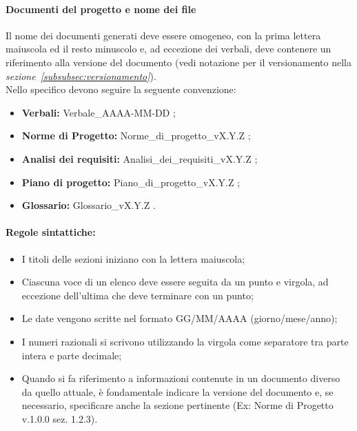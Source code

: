 \paragraph*{Documenti del progetto e nome dei file}\label{sec:NomeFile}
Il nome dei documenti generati deve essere omogeneo, con la prima lettera maiuscola ed il resto minuscolo e, ad eccezione dei verbali, deve contenere un riferimento alla versione del documento (vedi notazione per il versionamento nella \textit{sezione~\ref{subsubsec:versionamento}}). \\
Nello specifico devono seguire la seguente convenzione:
\begin{itemize}
    \item \textbf{Verbali:} Verbale\_AAAA-MM-DD ;
    \item \textbf{Norme di Progetto:} Norme\_di\_progetto\_vX.Y.Z ;
    \item \textbf{Analisi dei requisiti:} Analisi\_dei\_requisiti\_vX.Y.Z ;
    \item \textbf{Piano di progetto:} Piano\_di\_progetto\_vX.Y.Z ;
    \item \textbf{Glossario:} Glossario\_vX.Y.Z .
\end{itemize}

\paragraph*{Regole sintattiche:}
\begin{itemize}
    \item I titoli delle sezioni iniziano con la lettera maiuscola;
    \item Ciascuna voce di un elenco deve essere seguita da un punto e virgola, ad eccezione dell'ultima che deve terminare con un punto;
    \item Le date vengono scritte nel formato GG/MM/AAAA (giorno/mese/anno);
    \item I numeri razionali si scrivono utilizzando la virgola come separatore tra parte intera e parte decimale;
    \item Quando si fa riferimento a informazioni contenute in un documento diverso da quello attuale, è fondamentale indicare la versione del documento e, se necessario, specificare anche la sezione pertinente (Ex: Norme di Progetto v.1.0.0 sez. 1.2.3).
\end{itemize}

